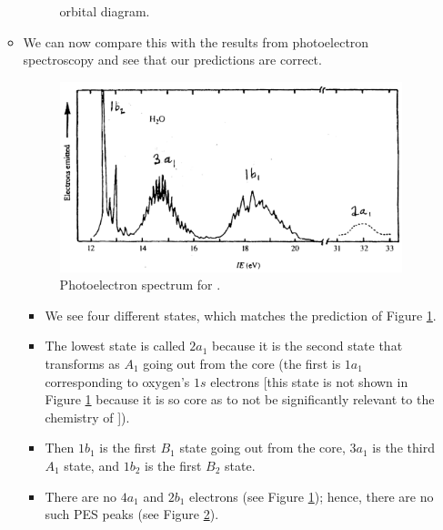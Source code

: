 \documentclass[../notes.tex]{subfiles}
\begin{document}
\begin{itemize}
\begin{itemize}
\begin{figure}[H]
            \caption{ orbital diagram.}
            \label{fig:orbitalDiagram-H2O}
        \end{figure}
        \item We can now compare this with the results from photoelectron spectroscopy and see that our predictions are correct.
        \begin{figure}[h!]
            \centering
            \includegraphics[width=0.6\linewidth]{../ExtFiles/PES-H2O.png}
            \caption{Photoelectron spectrum for .}
            \label{fig:PES-H2O}
        \end{figure}
        \begin{itemize}
            \item We see four different states, which matches the prediction of Figure \ref{fig:orbitalDiagram-H2O}.
            \item The lowest state is called $2a_1$ because it is the second state that transforms as $A_1$ going out from the core (the first is $1a_1$ corresponding to oxygen's $1s$ electrons [this state is not shown in Figure \ref{fig:orbitalDiagram-H2O} because it is so core as to not be significantly relevant to the chemistry of ]).
            \item Then $1b_1$ is the first $B_1$ state going out from the core, $3a_1$ is the third $A_1$ state, and $1b_2$ is the first $B_2$ state.
            \item There are no $4a_1$ and $2b_1$ electrons (see Figure \ref{fig:orbitalDiagram-H2O}); hence, there are no such PES peaks (see Figure \ref{fig:PES-H2O}).

\end{itemize}
\end{itemize}
\end{itemize}
\end{document}
